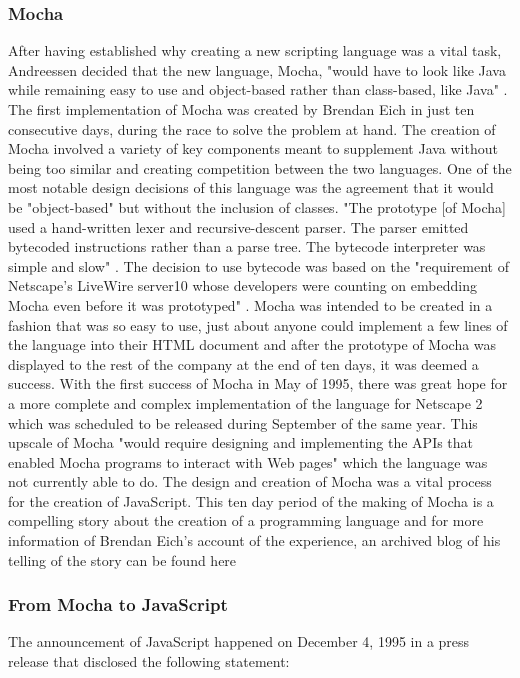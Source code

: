 \documentclass{article}
\theoremstyle{theorem}
\theoremstyle{definition}
\theoremstyle{remark}
\begin{document}
\subsubsection{Mocha}
After having established why creating a new scripting language was a vital task, Andreessen decided that the new language, Mocha, "would have to look like Java while remaining easy to use and object-based rather than class-based, like Java" \cite{1}. The first implementation of Mocha was created by Brendan Eich in just ten consecutive days, during the race to solve the problem at hand. The creation of Mocha involved a variety of key components meant to supplement Java without being too similar and creating competition between the two languages. One of the most notable design decisions of this language was the agreement that it would be "object-based" but without the inclusion of classes. "The
prototype [of Mocha] used a hand-written lexer and recursive-descent parser. The parser emitted bytecoded instructions rather than a parse tree. The bytecode interpreter was simple and slow" \cite{1}. The decision to use bytecode was based on the "requirement of Netscape’s LiveWire server10 whose developers were counting on embedding Mocha even before it was prototyped" \cite{1}. Mocha was intended to be created in a fashion that was so easy to use, just about anyone could implement a few lines of the language into their HTML document and after the prototype of Mocha was displayed to the rest of the company at the end of ten days, it was deemed a success. With the first success of Mocha in May of 1995, there was great hope for a more complete and complex implementation of the language for Netscape 2 which was scheduled to be released during September of the same year. This upscale of Mocha "would require designing and implementing the APIs that enabled Mocha programs to interact with Web pages" \cite{1} which the language was not currently able to do. The design and creation of Mocha was a vital process for the creation of JavaScript. This ten day period of the making of Mocha is a compelling story about the creation of a programming language and for more information of Brendan Eich's account of the experience, an archived blog of his telling of the story can be found here \cite{BE}

\subsubsection{From Mocha to JavaScript}
The announcement of JavaScript happened on December 4, 1995 in a press release that disclosed the following statement:
\end{document}
